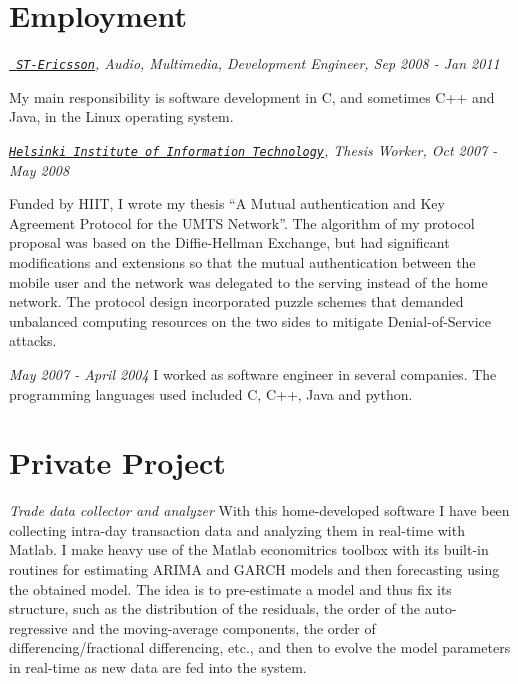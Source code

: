 \documentclass[10pt,letterpaper]{article}
\newenvironment{aperiod}{
  \begin{list}{}{
    \setlength{\leftmargin}{1.5em}
    \setlength{\itemsep}{1em}
    \setlength{\parskip}{0pt}
    \setlength{\parsep}{0.25em}
  }
}{
  \end{list}
}
\begin{document}
\section*{Employment}
\begin{aperiod}
\item {\it \href{http://www.stericsson.com}{\tt
      ST-Ericsson}, Audio, Multimedia, Development Engineer, Sep 2008
    - Jan 2011}

  My main responsibility is software development in C, and sometimes
  C++ and Java, in the Linux operating system.

\item {\it \href{http://www.hiit.fi}{\tt Helsinki
      Institute of Information Technology}, Thesis Worker, Oct 2007 -
    May 2008}

  Funded by HIIT, I wrote my thesis ``A Mutual authentication and Key
  Agreement Protocol for the UMTS Network''. The algorithm of my
  protocol proposal was based on the Diffie-Hellman Exchange, but had
  significant modifications and extensions so that the mutual
  authentication between the mobile user and the network was delegated
  to the serving instead of the home network. The protocol design
  incorporated puzzle schemes that demanded unbalanced computing
  resources on the two sides to mitigate Denial-of-Service attacks.

\item {\it May 2007 - April 2004}
  I worked as software engineer in several companies. The programming
  languages used included C, C++, Java and python.
\end{aperiod}

\section*{Private Project}
{\it Trade data collector and analyzer}
With this home-developed software I have been collecting intra-day
transaction data and analyzing them in real-time with Matlab. I make
heavy use of the Matlab economitrics toolbox with its built-in
routines for estimating ARIMA and GARCH models and then forecasting
using the obtained model. The idea is to pre-estimate a model and thus
fix its structure, such as the distribution of the residuals, the
order of the auto-regressive and the moving-average components, the
order of differencing/fractional differencing, etc., and then to 
evolve the model parameters in real-time as new data are fed into
the system.
\end{document}
